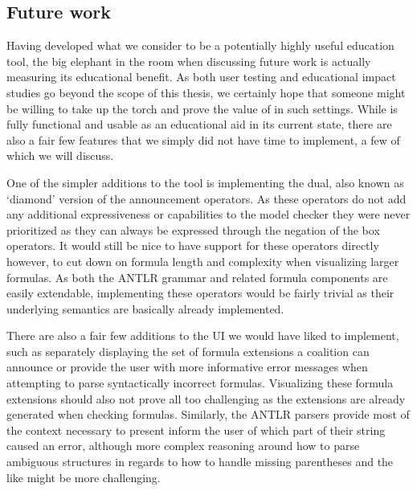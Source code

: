 \subsection{Future work}


Having developed what we consider to be a potentially highly useful education tool, the big elephant in the room when discussing future work is actually measuring its educational benefit. As both user testing and educational impact studies go beyond the scope of this thesis, we certainly hope that someone might be willing to take up the torch and prove the value of \cname in such settings. While \cname is fully functional and usable as an educational aid in its current state, there are also a fair few features that we simply did not have time to implement, a few of which we will discuss.

One of the simpler additions to the tool is implementing the dual, also known as `diamond' version of the announcement operators. As these operators do not add any additional expressiveness or capabilities to the model checker they were never prioritized as they can always be expressed through the negation of the box operators. It would still be nice to have support for these operators directly however, to cut down on formula length and complexity when visualizing larger formulas. As both the ANTLR grammar and related formula components are easily extendable, implementing these operators would be fairly trivial as their underlying semantics are basically already implemented.

There are also a fair few additions to the UI we would have liked to implement, such as separately displaying the set of formula extensions a coalition can announce or provide the user with more informative error messages when attempting to parse syntactically incorrect formulas. Visualizing these formula extensions should also not prove all too challenging as the extensions are already generated when checking formulas. Similarly, the ANTLR parsers provide most of the context necessary to present inform the user of which part of their string caused an error, although more complex reasoning around how to parse ambiguous structures in regards to how to handle missing parentheses and the like might be more challenging. 

\\

